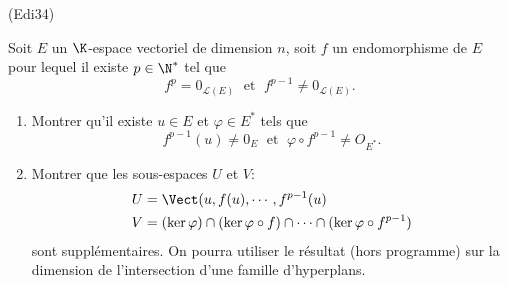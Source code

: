 \begin{tiny}(Edi34)\end{tiny} Soit $E$ un $\K$-espace vectoriel de dimension $n$, soit $f$ un endomorphisme de $E$ pour lequel il existe $p\in \N^*$ tel que 
\[
 f^p = 0_{\mathcal{L}(E)} \;\text{ et }\; f^{p-1} \neq 0_{\mathcal{L}(E)}.
\]
\begin{enumerate}
 \item Montrer qu'il existe $u\in E$ et $\varphi \in E^*$ tels que
 \[
  f^{p-1}(u) \neq  0_E \;\text{ et }\; \varphi \circ f^{p-1} \neq O_{E^*}.
 \]
 \item Montrer que les sous-espaces $U$ et $V$:
\[
\begin{aligned}
U &= \Vect(u,f(u),\cdots,f^{p-1}(u) \\
V &= (\ker \varphi) \cap (\ker \varphi\circ f) \cap \cdots \cap (\ker \varphi \circ f^{p-1}) 
\end{aligned}
\]
sont supplémentaires. On pourra utiliser le résultat (hors programme) sur la dimension de l'intersection d'une famille d'hyperplans.
\end{enumerate}